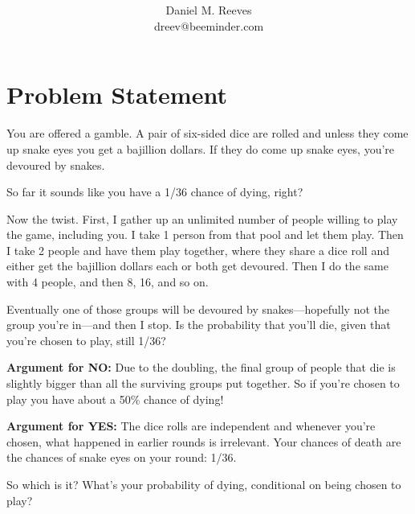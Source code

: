 \documentclass[article,twocolumn]{memoir}
\title{\HUGE\textbf{\longtitle}}
\author{Daniel M. Reeves\\dreev@beeminder.com}
\date{\protect\tstamp} %
\begin{document}
\pagestyle{headings}
\maketitle


\chapter*{Problem Statement}

You are offered a gamble.
A pair of six-sided dice are rolled and unless they come up snake eyes you get a bajillion dollars. 
If they do come up snake eyes, you're devoured by snakes.

So far it sounds like you have a 1/36 chance of dying, right?

Now the twist. 
First, I gather up an unlimited number of people willing to play the game, including you. 
I take 1 person from that pool and let them play. 
Then I take 2 people and have them play together, where they share a dice roll and either get the bajillion dollars each or both get devoured. 
Then I do the same with 4 people, and then 8, 16, and so on.

Eventually one of those groups will be devoured by snakes---hopefully not the group you're in---and then I stop.
Is the probability that you'll die, given that you're chosen to play, still 1/36?

\vspace{1em}

\textbf{Argument for NO:}
Due to the doubling, the final group of people that die is slightly bigger than all the surviving groups put together. 
So if you're chosen to play you have about a 50\% chance of dying!

\vspace{1em}

\textbf{Argument for YES:}
The dice rolls are independent and whenever you're chosen, what happened in earlier rounds is irrelevant.
Your chances of death are the chances of snake eyes on your round: 1/36.

\vspace{1em}

So which is it? 
What's your probability of dying, conditional on being chosen to play?
\end{document}
